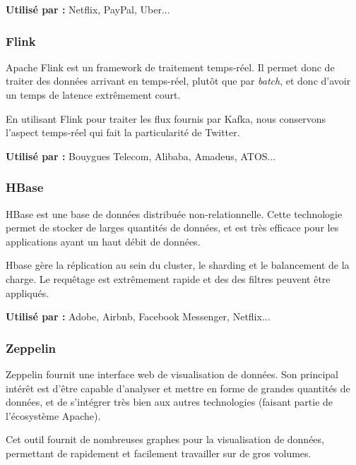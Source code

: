 \documentclass[a4paper,oneside,10pt]{article}
\begin{document}
\textbf{Utilisé par :} Netflix, PayPal, Uber...



\subsubsection{Flink}
Apache Flink est un framework de traitement temps-réel. Il permet donc de traiter des données arrivant en temps-réel, plutôt que par \textit{batch}, et donc d'avoir un temps de latence extr\^emement court.

En utilisant Flink pour traiter les flux fournis par Kafka, nous conservons l'aspect temps-réel qui fait la particularité de Twitter.

\textbf{Utilisé par :} Bouygues Telecom, Alibaba, Amadeus, ATOS...


\subsubsection{HBase}
HBase est une base de données distribuée non-relationnelle. Cette technologie permet de stocker de larges quantités de données, et est très efficace pour les applications ayant un haut débit de données.

Hbase gère la réplication au sein du cluster, le sharding et le balancement de la charge. Le requêtage est extrêmement rapide et des des filtres peuvent être appliqués.

\textbf{Utilisé par :} Adobe, Airbnb, Facebook Messenger, Netflix...


\subsubsection{Zeppelin}
Zeppelin fournit une interface web de visualisation de données. Son principal intérêt est d'être capable d'analyser et mettre en forme de grandes quantités de données, et de s'intégrer très bien aux autres technologies (faisant partie de l'écosystème Apache).

Cet outil fournit de nombreuses graphes pour la visualisation de données, permettant de rapidement et facilement travailler sur de gros volumes.
\end{document}
